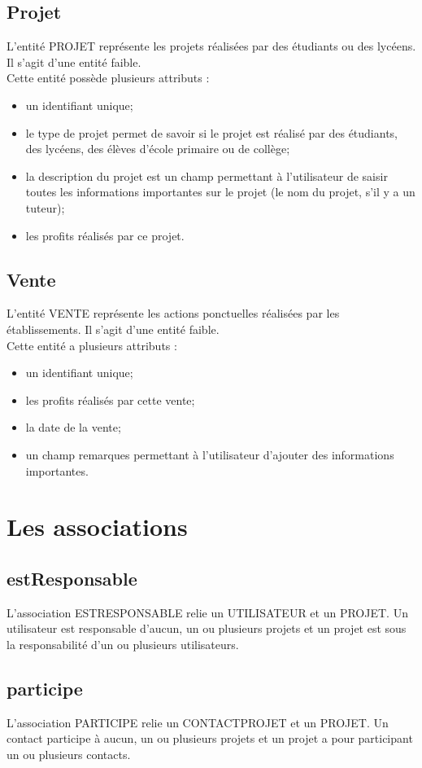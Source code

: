 \documentclass[asi, sansVersion]{picInsa}
\begin{document}
\subsection*{Projet}
L'entité PROJET représente les projets réalisées par des étudiants ou des lycéens. Il s'agit d'une entité faible.\\
Cette entité possède plusieurs attributs : 
\begin{itemize}
\item un identifiant unique;
\item  le type de projet permet de savoir si le projet est réalisé par des étudiants, des lycéens, des élèves d'école primaire ou de collège; 
\item la description du projet est un champ permettant à l'utilisateur de saisir toutes les informations importantes sur le projet (le nom du projet, s'il y a un tuteur);
\item les profits réalisés par ce projet.
\end{itemize}

\subsection*{Vente}
L'entité VENTE représente les actions ponctuelles réalisées par les établissements. Il s'agit d'une entité faible.\\ 
Cette entité a plusieurs attributs : 
\begin{itemize}
\item un identifiant unique; 
\item les profits réalisés par cette vente;
\item la date de la vente;
\item un champ remarques permettant à l'utilisateur d'ajouter des informations importantes. 
\end{itemize}
\section{Les associations}

\subsection*{estResponsable}
L'association ESTRESPONSABLE relie un UTILISATEUR et un PROJET. Un utilisateur est responsable d'aucun, un ou plusieurs projets et un projet est sous la responsabilité d'un ou plusieurs utilisateurs.

\subsection*{participe}
L'association PARTICIPE relie un CONTACTPROJET et un PROJET. Un contact participe à aucun, un ou plusieurs projets et un projet a pour participant un ou plusieurs contacts.
\end{document}

